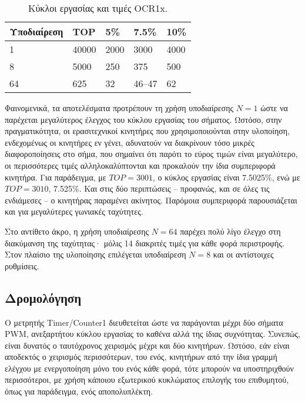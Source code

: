 \begin{table}
    \caption{Κύκλοι εργασίας και τιμές OCR1x. \label{tab:motor:prescaler}}
\begin{center}
\begin{tabu} spread 0pt {*5{X[-1r]}}

    \rowfont\bfseries
    Υποδιαίρεση &   TOP &      5\% &   7.5\% &   10\%                         \\
     & 40000 &     2000 &    3000 &   4000                         \\
              8 &  5000 &      250 &     375 &    500                         \\
             64 &   625 &       32 &  46--47 &     62                         \\
\end{tabu}
\end{center}\end{table}

Φαινομενικά, τα αποτελέσματα προτρέπουν τη χρήση υποδιαίρεσης $N = 1$ ώστε να
παρέχεται μεγαλύτερος έλεγχος του κύκλου εργασίας του σήματος. Ωστόσο, στην
πραγματικότητα, οι ερασιτεχνικοί κινητήρες που χρησιμοποιούνται στην υλοποίηση,
ενδεχομένως οι κινητήρες εν γένει, αδυνατούν να διακρίνουν τόσο μικρές
διαφοροποίησεις στο σήμα, που σημαίνει ότι παρότι το εύρος τιμών είναι
μεγαλύτερο, οι περισσότερες τιμές αλληλοκαλύπτονται και προκαλούν την ίδια
συμπεριφορά κινητήρα. Για παράδειγμα, με $TOP = 3001$, ο κύκλος εργασίας είναι
7.5025\%, ενώ με $TOP = 3010$, 7.525\%. Και στις δύο περιπτώσεις -- προφανώς,
και σε όλες τις ενδιάμεσες -- ο κινητήρας παραμένει ακίνητος. Παρόμοια
συμπεριφορά παρουσιάζεται και για μεγαλύτερες γωνιακές ταχύτητες.

Στο αντίθετο άκρο, η χρήση υποδιαίρεσης $N = 64$ παρέχει πολύ λίγο έλεγχο στη
διακύμανση της ταχύτητας· μόλις 14 διακριτές τιμές για κάθε φορά περιστροφής.
Στον πλαίσιο της υλοποίησης επιλέγεται υποδιαίρεση $N = 8$ και οι αντίστοιχες
ρυθμίσεις.


\subsection{Δρομολόγηση}

Ο μετρητής \textenglish{Timer\slash Counter1} διευθετείται ώστε να παράγονται
μέχρι δύο σήματα PWM, ανεξαρτήτου κύκλου εργασίας το καθένα αλλά της ίδιας
συχνότητας. Συνεπώς, είναι δυνατός ο ταυτόχρονος χειρισμός μέχρι και δύο
κινητήρων. Ωστόσο, εάν είναι αποδεκτός ο χειρισμός περισσότερων, του ενός,
κινητήρων από την ίδια γραμμή ελέγχου με ενεργοποίηση μόνο του ενός κάθε φορά,
τότε μπορούν να υποστηριχθούν περισσότεροι, με χρήση κάποιου εξωτερικού
κυκλώματος επιλογής του επιθυμητού, όπως για παράδειγμα, ενός αποπολυπλέκτη.


